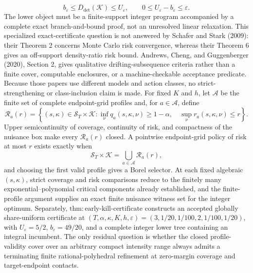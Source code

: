 \[
 b_\varepsilon\le\overline D_{\mathrm{det}}(\mathcal K)\le U_\varepsilon,
 \qquad 0\le U_\varepsilon-b_\varepsilon\le\varepsilon.
\]
The lower object must be a finite-support integer program accompanied by a complete exact branch-and-bound proof, not an unresolved linear relaxation. This specialized exact-certificate question is not answered by Schafer and Stark (2009): their Theorem 2 concerns Monte Carlo risk convergence, whereas their Theorem 6 gives an off-support density-ratio risk bound. Andrews, Cheng, and Guggenberger (2020), Section 2, gives qualitative drifting-subsequence criteria rather than a finite cover, computable enclosures, or a machine-checkable acceptance predicate. Because those papers use different models and action classes, no strict-strengthening or class-inclusion claim is made.
For fixed \(K\) and \(h\), let \(\mathcal A\) be the finite set of complete endpoint-grid profiles and, for \(a\in\mathcal A\), define
\[
 \mathcal R_a(r)=\left\{(s,\kappa)\in\mathcal S_T\times\mathcal K:
 \inf_{\nu}q_a(s,\kappa,\nu)\ge1-\alpha,
 \quad
 \sup_{\nu}r_a(s,\kappa,\nu)\le r
 \right\}.
\]
Upper semicontinuity of coverage, continuity of risk, and compactness of the nuisance box make every \(\mathcal R_a(r)\) closed. A pointwise endpoint-grid policy of risk at most \(r\) exists exactly when
\[
 \mathcal S_T\times\mathcal K=\bigcup_{a\in\mathcal A}\mathcal R_a(r),
\]
and choosing the first valid profile gives a Borel selector. At each fixed algebraic \((s,\kappa)\), strict coverage and risk comparisons reduce to the finitely many exponential--polynomial critical components already established, and the finite-profile argument supplies an exact finite nuisance witness set for the integer optimum. Separately, \(\mathrm{thm{:}early\text{-}kill\text{-}certificate}\) constructs an accepted globally share-uniform certificate at \((T,\alpha,\kappa,K,h,\varepsilon)=(3,1/20,1/100,2,1/100,1/20)\), with \(U_\varepsilon=5/2\), \(b_\varepsilon=49/20\), and a complete integer lower tree containing an integral incumbent. The only residual question is whether the closed profile-validity cover over an arbitrary compact intensity range always admits a terminating finite rational-polyhedral refinement at zero-margin coverage and target-endpoint contacts.
